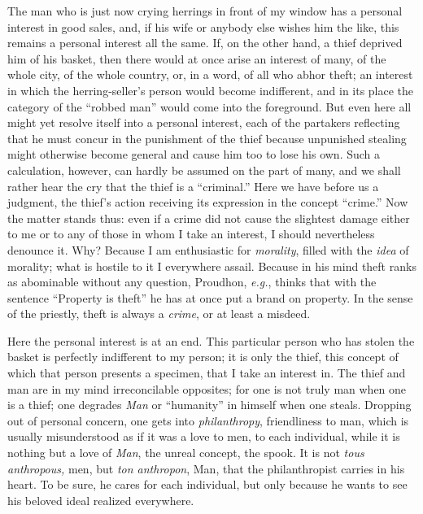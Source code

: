 \documentclass[12pt,a4paper]{book}
\begin{document}
The man who is just now crying herrings in front of my window has a personal 
interest in good sales, and, if his wife or anybody else wishes him the like, 
this remains a personal interest all the same. If, on the other hand, a thief 
deprived him of his basket, then there would at once arise an interest of 
many, of the whole city, of the whole country, or, in a word, of all who abhor 
theft; an interest in which the herring-seller's person would become 
indifferent, and in its place the category of the ``robbed man'' would come 
into the foreground. But even here all might yet resolve itself into a 
personal interest, each of the partakers reflecting that he must concur in the 
punishment of the thief because unpunished stealing might otherwise become 
general and cause him too to lose his own. Such a calculation, however, can 
hardly be assumed on the part of many, and we shall rather hear the cry that 
the thief is a ``criminal.'' Here we have before us a judgment, the thief's 
action receiving its expression in the concept ``crime.'' Now the matter 
stands thus: even if a crime did not cause the slightest damage either to me 
or to any of those in whom I take an interest, I should nevertheless denounce 
it. Why? Because I am enthusiastic for \textit{morality}, filled with the 
\textit{idea} of morality; what is hostile to it I everywhere assail. Because 
in his mind theft ranks as abominable without any question, Proudhon, 
\textit{e.g.}, thinks that with the sentence ``Property is theft'' he has 
at once put a brand on property. In the sense of the priestly, theft is always 
a \textit{crime}, or at least a misdeed.

Here the personal interest is at an end. This particular person who has stolen 
the basket is perfectly indifferent to my person; it is only the thief, this 
concept of which that person presents a specimen, that I take an interest in. 
The thief and man are in my mind irreconcilable opposites; for one is not 
truly man when one is a thief; one degrades \textit{Man} or ``humanity'' in 
himself when one steals. Dropping out of personal concern, one gets into 
\textit{philanthropy}, friendliness to man, which is usually misunderstood as 
if it was a love to men, to each individual, while it is nothing but a love of 
\textit{Man}, the unreal concept, the spook. It is not \textit{tous 
anthropous,} men, but \textit{ton anthropon}, Man, that the philanthropist 
carries in his heart. To be sure, he cares for each individual, but only 
because he wants to see his beloved ideal realized everywhere.
\end{document}
